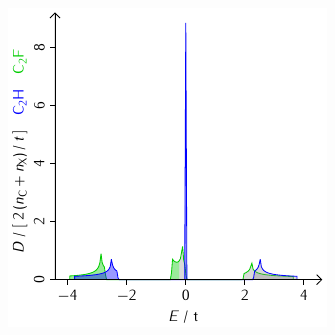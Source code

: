 \documentclass{beamer}
\begin{document}
\begin{frame}
\begin{minipage}{0.48\textwidth}
		\end{minipage}
		\hfill
		\begin{minipage}{0.48\textwidth}
			\includegraphics[width=\textwidth]{Abbildungen/Bandstrukturen/DOS_C2X.pdf}
		\end{minipage}
	\end{frame}
	
\end{document}
